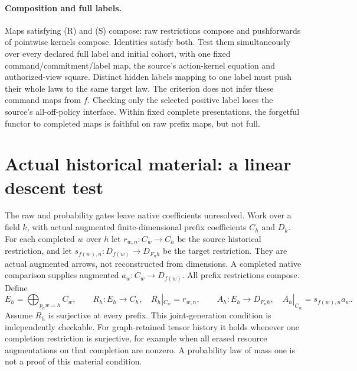 \documentclass{article}
\begin{document}
\paragraph{Composition and full labels.}
Maps satisfying (R) and (S) compose: raw restrictions compose and pushforwards of pointwise kernels compose. Identities satisfy both. Test them simultaneously over every declared full label and initial cohort, with one fixed command/commitment/label map, the source's action-kernel equation and authorized-view square. Distinct hidden labels mapping to one label must push their whole laws to the same target law. The criterion does not infer these command maps from $f$. Checking only the selected positive label loses the source's all-off-policy interface. Within fixed complete presentations, the forgetful functor to completed maps is faithful on raw prefix maps, but not full.

\section{Actual historical material: a linear descent test}
The raw and probability gates leave native coefficients unresolved. Work over a field $k$, with actual augmented finite-dimensional prefix coefficients $C_h$ and $D_k$. For each completed $w$ over $h$ let $r_{w,n}:C_w\to C_h$ be the source historical restriction, and let $s_{f(w),n}:D_{f(w)}\to D_{F_nh}$ be the target restriction. They are actual augmented arrows, not reconstructed from dimensions. A completed native comparison supplies augmented $a_w:C_w\to D_{f(w)}$. All prefix restrictions compose. Define
\[
 E_h=\bigoplus_{p_nw=h}C_w,\qquad
 R_h:E_h\to C_h,\quad R_h|_{C_w}=r_{w,n},\qquad
 A_h:E_h\to D_{F_nh},\quad A_h|_{C_w}=s_{f(w),n}a_w.
\]
Assume $R_h$ is surjective at every prefix. This joint-generation condition is independently checkable. For graph-retained tensor history it holds whenever one completion restriction is surjective, for example when all erased resource augmentations on that completion are nonzero. A probability law of mass one is not a proof of this material condition.
\end{document}
